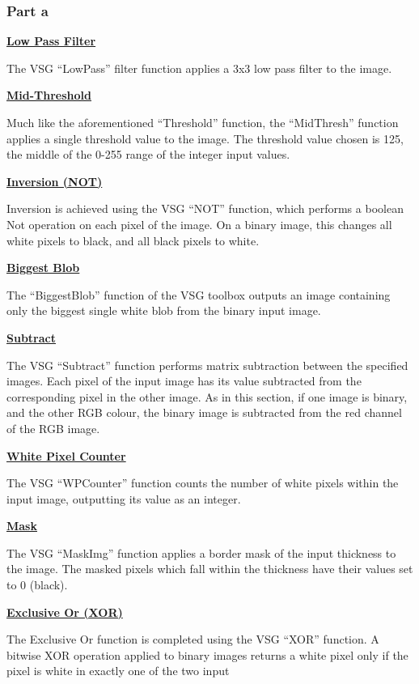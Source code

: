\documentclass[a4paper]{article}
\begin{document}
	\subsubsection{Part a}
	\underline{\textbf{Low Pass Filter}}
	\par The VSG ``LowPass'' filter function applies a 3x3 low pass filter
	to the image.
	\par\underline{\textbf{Mid-Threshold}}
	\par Much like the aforementioned ``Threshold'' function, the
	``MidThresh'' function applies a single threshold value to the image.
	The threshold value chosen is 125, the middle of the 0-255 range of the
	integer input values.
	\par\underline{\textbf{Inversion (NOT)}}
	\par Inversion is achieved using the VSG ``NOT'' function, which
	performs a boolean Not operation on each pixel of the image. On a binary
	image, this changes all white pixels to black, and all black pixels to
	white.
	\par\underline{\textbf{Biggest Blob}}
	\par The ``BiggestBlob'' function of the VSG toolbox outputs an image
	containing only the biggest single white blob from the binary input
	image.
	\par\underline{\textbf{Subtract}}
	\par The VSG ``Subtract'' function performs matrix subtraction between the
	specified images. Each pixel of the input image has its value
	subtracted from the corresponding pixel in the other image. As in this
	section, if one	image is binary, and the other RGB colour, the binary
	image is subtracted from the red channel of the RGB image.
	\par\underline{\textbf{White Pixel Counter}}
	\par The VSG ``WPCounter'' function counts the number of white pixels
	within the input image, outputting its value as an integer.
	\par\underline{\textbf{Mask}}
	\par The VSG ``MaskImg'' function applies a border mask of the input
	thickness to the image. The masked pixels which fall within the
	thickness have their values set to 0 (black).
	\par\underline{\textbf{Exclusive Or (XOR)}}
	\par The Exclusive Or function is completed using the VSG ``XOR''
	function. A bitwise XOR operation applied to binary images returns a
	white pixel only if the pixel is white in exactly one of the two input
\end{document}
